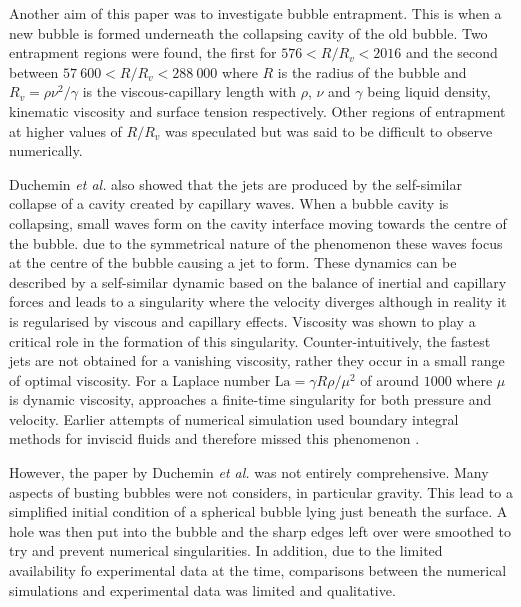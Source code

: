 Another aim of this paper was to investigate bubble entrapment. This is when a new bubble is formed underneath the collapsing cavity of the old bubble. Two entrapment regions were found, the first for $576<R/R_v<2016$ and the second between $57\:600<R/R_v<288\:000$ where $R$ is the radius of the bubble and $R_v=\rho\nu^2/\gamma$ is the viscous-capillary length with $\rho$, $\nu$ and $\gamma$ being liquid density, kinematic viscosity and surface tension respectively. Other regions of entrapment at higher values of $R/R_v$ was speculated but was said to be difficult to observe numerically.

Duchemin \textit{et al.} also showed that the jets are produced by the self-similar collapse of a cavity created by capillary waves. When a bubble cavity is collapsing, small waves form on the cavity interface moving towards the centre of the bubble. due to the symmetrical nature of the phenomenon these waves focus at the centre of the bubble causing a jet to form. These dynamics can be described by a self-similar dynamic based on the balance of inertial and capillary forces \cite{brenner2000jets} and leads to a singularity where the velocity diverges although in reality it is regularised by viscous and capillary effects. Viscosity was shown to play a critical role in the formation of this singularity. Counter-intuitively, the fastest jets are not obtained for a vanishing viscosity, rather they occur in a small range of optimal viscosity. For a Laplace number $\text{La}=\gamma R\rho/\mu^2$ of around $1000$ where $\mu$ is dynamic viscosity, approaches a finite-time singularity for both pressure and velocity. \cite{brenner2000jets} Earlier attempts of numerical simulation used boundary integral methods for inviscid fluids and therefore missed this phenomenon \cite{oguz1993dynamics}.

However, the paper by Duchemin \textit{et al.} was not entirely comprehensive. Many aspects of busting bubbles were not considers, in particular gravity. This lead to a simplified initial condition of a spherical bubble lying just beneath the surface. A hole was then put into the bubble and the sharp edges left over were smoothed to try and prevent numerical singularities. In addition, due to the limited availability fo experimental data at the time, comparisons between the numerical simulations and experimental data was limited and qualitative.

